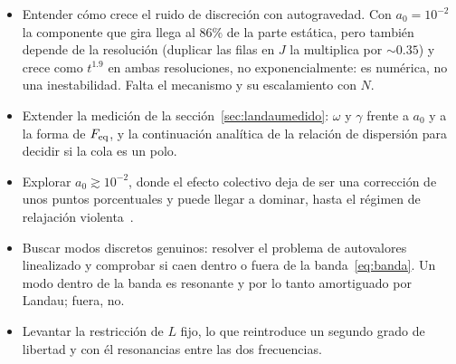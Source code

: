 \documentclass[11pt,a4paper]{article}
\newcommand{\Jr}{J}
\theoremstyle{definition}
\begin{document}
\begin{itemize}
  \item Entender cómo crece el ruido de discreción con autogravedad. Con
    $a_0=10^{-2}$ la componente que gira llega al $86\%$ de la parte estática, pero
    también depende de la resolución (duplicar las filas en $\Jr$ la multiplica por
    $\sim0.35$) y crece como $t^{1.9}$ en ambas resoluciones, no exponencialmente: es
    numérica, no una inestabilidad. Falta el mecanismo y su escalamiento con $N$.
  \item Extender la medición de la sección~\ref{sec:landaumedido}: $\omega$ y $\gamma$
    frente a $a_0$ y a la forma de $F_{\rm eq}$, y la continuación analítica de la
    relación de dispersión para decidir si la cola es un polo.
  \item Explorar $a_0\gtrsim10^{-2}$, donde el efecto colectivo deja de ser una
    corrección de unos puntos porcentuales y puede llegar a dominar, hasta el
    régimen de relajación violenta~\cite{lyndenbell1967}.
  \item Buscar modos discretos genuinos: resolver el problema de autovalores
    linealizado y comprobar si caen dentro o fuera de la banda~\eqref{eq:banda}. Un
    modo dentro de la banda es resonante y por lo tanto amortiguado por Landau;
    fuera, no.
  \item Levantar la restricción de $L$ fijo, lo que reintroduce un segundo grado de
    libertad y con él resonancias entre las dos frecuencias.
\end{itemize}
\end{document}
